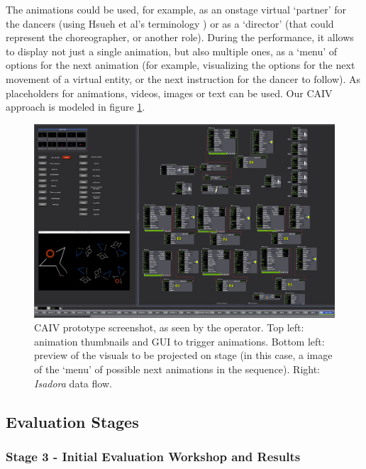 The animations could be used, for example, as an onstage virtual ‘partner’ for the dancers (using Hsueh et al’s terminology \cite{hsueh_understanding_2019}) or as a ‘director’ (that could represent the choreographer, or another role). During the performance, it allows to display not just a single animation, but also multiple ones, as a ‘menu’ of options for the next animation (for example, visualizing the options for the next movement of a virtual entity, or the next instruction for the dancer to follow). As placeholders for animations, videos, images or text can be used. Our CAIV approach is modeled in figure \ref{fig:hitl-screenshot}.

\begin{figure}[ht]
  \centering
  \includegraphics[width=0.65\linewidth]{Chapters/Figures/modi_dis/hitl-screenshot-s.jpg}
  \caption[Composite animations prototype, from the operator's perspective]{CAIV prototype screenshot, as seen by the operator. Top left: animation thumbnails and GUI to trigger animations. Bottom left: preview of the visuals to be projected on stage (in this case, a image of the ‘menu’ of possible next animations in the sequence). Right: \textit{Isadora} data flow.}
    \label{fig:hitl-screenshot}
\end{figure}


\subsection{Evaluation Stages}

\subsubsection{Stage 3 - Initial Evaluation Workshop and Results}

